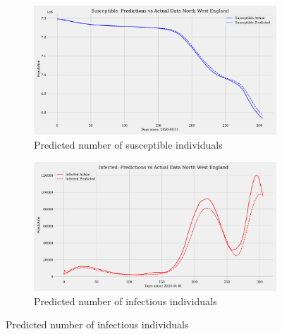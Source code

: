 \documentclass[12pt]{article}
\begin{document}
\begin{figure}
    \centering
    \begin{subfigure}[t]{0.45\textwidth}
        \includegraphics[width=\textwidth]{images/pinn/S_predictions_North West England.pdf}
        \caption{Predicted number of susceptible individuals}
        \label{fig:S_predictions_North West England}
    \end{subfigure}
    \hfill %
    \begin{subfigure}[t]{0.45\textwidth}
        \includegraphics[width=\textwidth]{images/pinn/I_predictions_North West England.pdf}
        \caption{Predicted number of infectious individuals}
        \label{fig:I_predictions_North West England}
    \end{subfigure}

    \vspace{0.5cm}


\end{figure}
\end{document}
